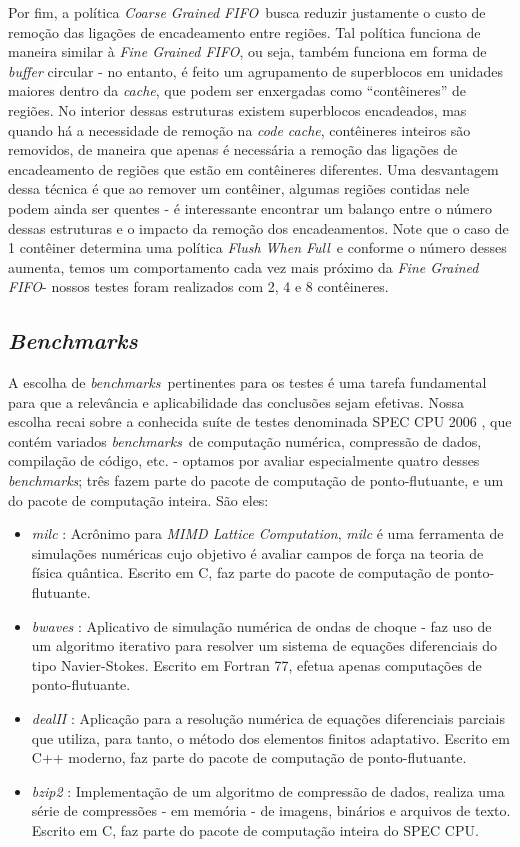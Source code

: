 \documentclass[12pt,twoside]{article}
\newcommand{\ccache}{\emph{code cache}}
\newcommand{\cache}{\emph{cache}}
\newcommand{\benchmarks}{\emph{benchmarks}}
\newcommand{\flush}{\emph{Flush When Full}}
\newcommand{\finefifo}{\emph{Fine Grained FIFO}}
\newcommand{\coarsefifo}{\emph{Coarse Grained FIFO}}
\newcommand{\qq}[1]{``#1''}
\begin{document}
Por fim, a política \coarsefifo~busca reduzir justamente o custo de remoção das ligações de encadeamento entre regiões. Tal política funciona de maneira similar à \finefifo, ou seja, também funciona em forma de \emph{buffer} circular - no entanto, é feito um agrupamento de superblocos em unidades maiores dentro da \cache, que podem ser enxergadas como \qq{contêineres} de regiões. No interior dessas estruturas existem superblocos encadeados, mas quando há a necessidade de remoção na \ccache, contêineres inteiros são removidos, de maneira que apenas é necessária a remoção das ligações de encadeamento de regiões que estão em contêineres diferentes. Uma desvantagem dessa técnica é que ao remover um contêiner, algumas regiões contidas nele podem ainda ser quentes - é interessante encontrar um balanço entre o número dessas estruturas e o impacto da remoção dos encadeamentos. Note que o caso de 1 contêiner determina uma política \flush~e conforme o número desses aumenta, temos um comportamento cada vez mais próximo da \finefifo - nossos testes foram realizados com 2, 4 e 8 contêineres.


\subsection{\emph{Benchmarks}}
A escolha de \benchmarks~pertinentes para os testes é uma tarefa fundamental para que a relevância e aplicabilidade das conclusões sejam efetivas. Nossa escolha recai sobre a conhecida suíte de testes denominada SPEC CPU 2006 \cite{spec-url}, que contém variados \benchmarks~de computação numérica, compressão de dados, compilação de código, etc. - optamos por avaliar especialmente quatro desses \benchmarks; três fazem parte do pacote de computação de ponto-flutuante, e um do pacote de computação inteira. São eles:

\begin{itemize}
\item \emph{milc} \cite{milc-url}: Acrônimo para \emph{MIMD Lattice Computation}, \emph{milc} é uma ferramenta de simulações numéricas cujo objetivo é avaliar campos de força na teoria de física quântica. Escrito em C, faz parte do pacote de computação de ponto-flutuante.

\item \emph{bwaves} \cite{bwaves-url}: Aplicativo de simulação numérica de ondas de choque - faz uso de um algoritmo iterativo para resolver um sistema de equações diferenciais do tipo Navier-Stokes. Escrito em Fortran 77, efetua apenas computações de ponto-flutuante.

\item \emph{dealII} \cite{deal-url}: Aplicação para a resolução numérica de equações diferenciais parciais que utiliza, para tanto, o método dos elementos finitos adaptativo. Escrito em C++ moderno, faz parte do pacote de computação de ponto-flutuante.

\item \emph{bzip2} \cite{bzip-url}: Implementação de um algoritmo de compressão de dados, realiza uma série de compressões - em memória - de imagens, binários e arquivos de texto. Escrito em C, faz parte do pacote de computação inteira do SPEC CPU.
\end{itemize}
\end{document}
